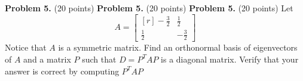 \documentclass[12pt]{article}
\begin{document}
\clearpage

\textbf{Problem 5.} (20 points) 
\textbf{Problem 5.} (20 points) 
\textbf{Problem 5.} (20 points) 
Let
\[
A=\begin{bmatrix*}[r]- \frac{3}{2} & \frac{1}{2}\\\frac{1}{2} & - \frac{3}{2}\end{bmatrix*}
\]
Notice that $A$ is a symmetric matrix.
Find an orthonormal basis of eigenvectors of $A$ and a matrix $P$ such that $D=P^TAP$ 
is a diagonal matrix. Verify that your answer is correct by computing $P^TAP$

\end{document}
